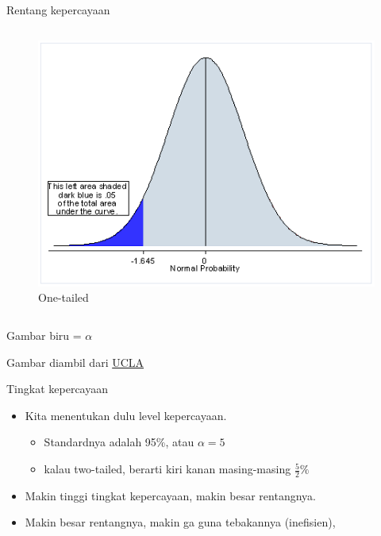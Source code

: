 \documentclass[
  ignorenonframetext,
]{beamer}
\begin{document}
\begin{frame}{Rentang kepercayaan}
\begin{columns}[T]
\begin{column}{0.47\textwidth}
\begin{figure}[H]
{\centering \includegraphics{pvalue2.gif}

}

\caption{One-tailed}

\end{figure}%
\end{column}
\end{columns}

Gambar biru = \(\alpha\)

Gambar diambil dari
\href{https://stats.oarc.ucla.edu/other/mult-pkg/faq/general/faq-what-are-the-differences-between-one-tailed-and-two-tailed-tests/}{UCLA}
\end{frame}

\begin{frame}{Tingkat kepercayaan}
\label{tingkat-kepercayaan}
\begin{itemize}
\item
  Kita menentukan dulu level kepercayaan.

  \begin{itemize}
  \item
    Standardnya adalah 95\%, atau \(\alpha=5%
    \)
  \item
    kalau two-tailed, berarti kiri kanan masing-masing \(\frac{5}{2}\%\)
  \end{itemize}
\item
  Makin tinggi tingkat kepercayaan, makin besar rentangnya.
\item
  Makin besar rentangnya, makin ga guna tebakannya (inefisien),
\end{itemize}
\end{frame}
\end{document}
